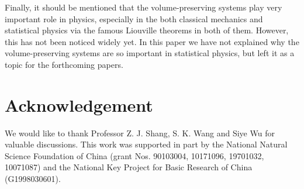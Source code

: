 \documentclass[12pt,a4paper]{article}
\begin{document}
 Finally, it should
be mentioned that the volume-preserving systems play very
important role in  physics, especially in the both classical
mechanics and statistical physics via the famous Liouville
theorems in both of them. However, this has not been noticed widely
yet. In this paper we have not explained why the volume-preserving
systems are so important in statistical physics, but left it as a
topic for the forthcoming papers.


\section*{Acknowledgement}

We would like to thank Professor Z. J. Shang, S. K. Wang and Siye
Wu for valuable discussions. This work was supported in part by
the National Natural Science Foundation of China (grant Nos.
90103004, 10171096, 19701032, 10071087) and the National Key
Project  for Basic Research of China (G1998030601).
\end{document}
